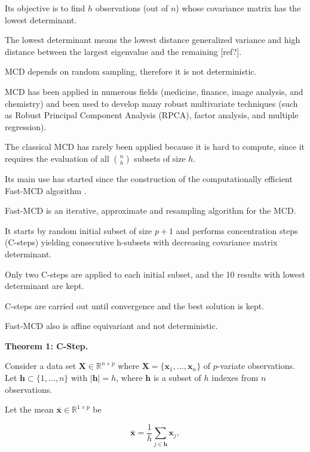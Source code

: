 \documentclass[review]{elsarticle}
\begin{document}
Its objective is to find $h$ observations (out of $n$) whose covariance matrix has the lowest determinant.

The lowest determinant means the lowest distance generalized variance and high distance between the largest eigenvalue and the remaining [ref?].

MCD depends on random sampling, therefore it is not deterministic.

MCD has been applied in numerous fields (medicine, finance, image analysis, and chemistry) and been used to develop many robust multivariate techniques (such as Robust Principal Component Analysis (RPCA), factor analysis, and multiple regression).

The classical MCD has rarely been applied because it is hard to compute, since it requires the evaluation of all $\binom{n}{h}$ subsets of size $h$. %

Its main use has started since the construction of the computationally efficient Fast-MCD algorithm \cite{rousseeuw1999fastmcd}.

Fast-MCD is an iterative, approximate and resampling algorithm for the MCD.

It starts by random initial subset of size $p+1$ and performs concentration steps (C-steps) yielding consecutive h-subsets with decreasing covariance matrix determinant.

Only two C-steps are applied to each initial subset, and the 10 results with lowest determinant are kept.

C-steps are carried out until convergence and the best solution is kept.

Fast-MCD also is affine equivariant and not deterministic.
	
\textbf{Theorem 1: C-Step.} 

Consider a data set $\boldsymbol{X} \in \mathbb{R}^{n \times p}$ where $\boldsymbol{X} = \{\boldsymbol{x}_1,...,\boldsymbol{x}_n\}$ of $p$-variate observations. Let $\boldsymbol{h} \subset \{1,...,n\}$ with $|\boldsymbol{h}| = h$, where $\boldsymbol{h}$ is a subset of $h$ indexes from $n$ observations.

Let the mean $\bar{\boldsymbol{x}} \in \mathbb{R}^{1 \times p}$ be

\begin{equation}\label{eq:eq02}
	\bar{\boldsymbol{x}} = \displaystyle\frac{1}{h}\displaystyle\sum_{j\in \boldsymbol{h}} \boldsymbol{x}_j, 
\end{equation}
\end{document}

